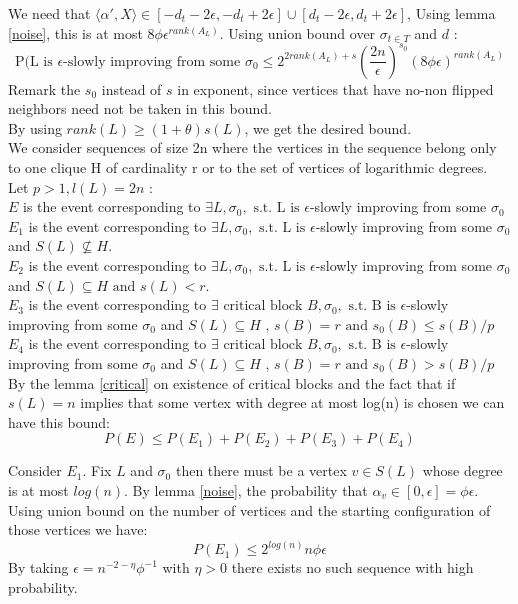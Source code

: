 \documentclass[12pt]{article}
\begin{document}
We need that $ \langle\alpha ', X \rangle \in [- d_t -2\epsilon, -d_t + 2\epsilon] \cup [d_t - 2\epsilon, d_t + 2\epsilon]$, Using lemma \ref{noise}, this is at most $8\phi\epsilon^{rank(A_L)}$. Using union bound over $\sigma_{t \in T}$ and $d$ :
\begin{equation*}
\text{P(L is }\epsilon\text{-slowly improving from some }\sigma_0 \leq 2^{2rank(A_L) + s}(\frac{2n}{\epsilon})^{s_0}(8\phi\epsilon)^{rank(A_L)}
\end{equation*}
Remark the $s_0$ instead of $s$ in exponent, since vertices that have no-non flipped neighbors need not be taken in this bound. \\
By using  $rank(L) \geq (1+\theta)s(L)$, we get the desired bound. \\

We consider sequences of size 2n where the vertices in the sequence belong only to one clique H of cardinality r or to the set of vertices of logarithmic degrees.\\
Let $ p > 1, l(L) = 2n$ : \\
$E$ is the event corresponding to $\exists L, \sigma_0, \text{ s.t. L is }\epsilon$-slowly improving from some $\sigma_0 $\\
$E_1$ is the event corresponding to $\exists L, \sigma_0, \text{ s.t. L is }\epsilon$-slowly improving from some $\sigma_0$ and $S(L) \not\subseteq H$.\\
$E_2$ is the event corresponding to $\exists L, \sigma_0,\text{ s.t. L is }\epsilon$-slowly improving from some $\sigma_0$ and $S(L) \subseteq H\text{ and }s(L) < r$. \\
$E_3$   is the event corresponding to $\exists \text{ critical block } B, \sigma_0,\text{ s.t. B is }\epsilon$-slowly improving from some $\sigma_0$ and $S(L) \subseteq H \text{ , } s(B) = r \text{ and } s_0(B) \leq s(B) / p$ \\
$E_4$   is the event corresponding to $\exists \text{ critical block } B, \sigma_0,\text{ s.t. B is }\epsilon$-slowly improving from some $\sigma_0$ and $S(L) \subseteq H \text{ , } s(B) = r \text{ and } s_0(B) > s(B) / p$ \\
By the lemma \ref{critical} on existence of critical blocks and the fact that if $s(L) = n$ implies that some vertex with degree at most log(n) is chosen we can have this bound:
\begin{equation*}
P(E) \leq P(E_1) + P(E_2) + P(E_3) + P(E_4)
\end{equation*}


Consider $E_1$. Fix $L$ and $\sigma_0$ then there must be a vertex $v \in S(L)$ whose degree is at most $log(n)$. By lemma  \ref{noise}, the probability that $\alpha_v \in [0, \epsilon] = \phi \epsilon$. Using union bound on the number of vertices and the starting configuration of those vertices we have:
\begin{equation*}
P(E_1)  \leq 2^{log(n)}n \phi \epsilon
\end{equation*}
By taking $\epsilon = n^{-2 - \eta} \phi^{-1}$ with $\eta > 0$ there exists no such sequence with high probability. \\
\end{document}
